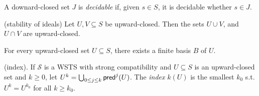 \iffalse
\begin{definition}
A {\em bi-ideal} $I \subseteq S$ is an upward-closed and downward-closed set, i.e
$\uparrow I = I = \downarrow I$.
\end{definition}

"Bi-ideals often represent “control states” as in [cf \%]. "

\fi

A downard-closed set $J$ is {\em decidable} if, given $s \in S$, it is decidable whether
$s \in J$. 

\begin{claim}{(stability of ideals)}
Let $U, V \subseteq S$ be upward-closed. Then the sets $U \cup V$, and $U \cap V$ are upward-closed.
\end{claim}



\begin{fact}\label{fact basis}
For every upward-closed set $U \subseteq S$, there exists a finite basis $B$ of $U$. 
\end{fact}


\begin{definition}{ (index)}. 
If $\mathscr{S}$ is a WSTS with strong compatibility and $U \subseteq S$  is an upward-closed set and $k \geq 0$, let $U^k= \bigcup_{0 \leq j \leq k} \textsf{pred}^j(U)$.
The {\em index} $k(U)$ is the
smallest $k_0$ s.t. $U^k = U^{k_0}$ for all $k \geq k_0$.
\end{definition}


